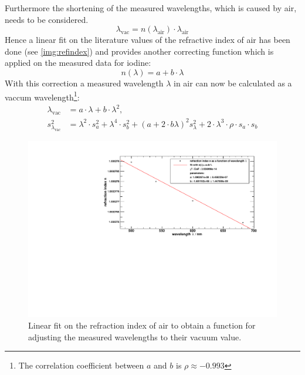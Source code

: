 Furthermore the shortening of the measured wavelengths, which is caused by air, needs to be considered.
\begin{equation}
  \lambda_{\text{vac}} = n(\lambda_{\text{air}}) \cdot \lambda_{\text{air}}
\end{equation}
Hence a linear fit on the literature values of the refractive index of air has been done (see \autoref{img:refindex}) and provides another
correcting function which is applied on the measured data for iodine:
\begin{equation}
  n(\lambda) = a + b \cdot \lambda
\end{equation}
With this correction a measured wavelength $\lambda$ in air can now be calculated as a vaccum wavelength\footnote{The correlation coefficient between $a$ and $b$ is $\rho \approx -0.993$}:
\begin{equation}
\begin{split}
  \lambda_{\text{vac}} &= a \cdot \lambda + b \cdot \lambda^2, \\
  s_{\lambda_{\text{vac}}}^2 &= 
  \lambda^2 \cdot s_a^2 + \lambda^4 \cdot s_b^2 + (a + 2 \cdot b \lambda)^2 s_{\lambda}^2 + 2 \cdot \lambda^3 \cdot \rho \cdot s_a \cdot s_b
\end{split}
\end{equation}

\begin{figure}[H]
\begin{center}
  \includegraphics[width=\textwidth]{../img/fit_lambda.pdf}
  \caption[---]{Linear fit on the refraction index of air to obtain a function for adjusting
  the measured wavelengths to their vacuum value.}
  \label{img:refindex}
\end{center}
\end{figure}

